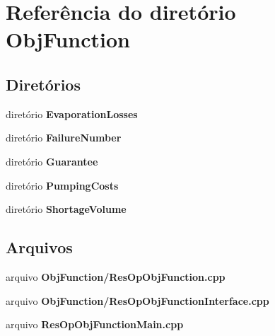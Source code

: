 \section{Referência do diretório Obj\+Function}
\label{dir_42e1c143826208f0e94508a3abfcf207}
\subsection*{Diretórios}
\begin{DoxyCompactItemize}
\item 
diretório {\bf Evaporation\+Losses}
\item 
diretório {\bf Failure\+Number}
\item 
diretório {\bf Guarantee}
\item 
diretório {\bf Pumping\+Costs}
\item 
diretório {\bf Shortage\+Volume}
\end{DoxyCompactItemize}
\subsection*{Arquivos}
\begin{DoxyCompactItemize}
\item 
arquivo {\bf Obj\+Function/\+Res\+Op\+Obj\+Function.\+cpp}
\item 
arquivo {\bf Obj\+Function/\+Res\+Op\+Obj\+Function\+Interface.\+cpp}
\item 
arquivo {\bf Res\+Op\+Obj\+Function\+Main.\+cpp}
\end{DoxyCompactItemize}
